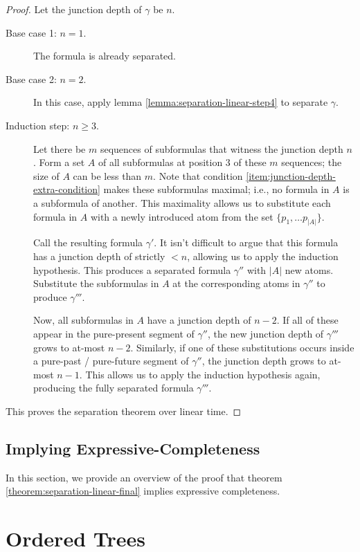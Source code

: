 \documentclass[a4paper,UKenglish,cleveref, autoref, thm-restate]{lipics-v2021}
\begin{document}
\begin{proof}
    Let the junction depth of $\gamma$ be $n$.
    \begin{description}
        \item[Base case 1: $n = 1$.] The formula is already separated.
        \item[Base case 2: $n = 2$.] In this case, apply lemma \ref{lemma:separation-linear-step4} to separate $\gamma$.
        \item[Induction step: $n \geq 3$.] Let there be $m$ sequences of subformulas that witness the junction depth $n$. Form a set $A$ of all subformulas at position 3 of these $m$ sequences; the size of $A$ can be less than $m$. Note that condition \ref{item:junction-depth-extra-condition} makes these subformulas maximal; i.e., no formula in $A$ is a subformula of another. This maximality allows us to substitute each formula in $A$ with a newly introduced atom from the set $\{p_1, \ldots p_{|A|}\}$.

        Call the resulting formula $\gamma'$. It isn't difficult to argue that this formula has a junction depth of strictly $< n$, allowing us to apply the induction hypothesis. This produces a separated formula $\gamma''$ with $|A|$ new atoms. Substitute the subformulas in $A$ at the corresponding atoms in $\gamma''$ to produce $\gamma'''$.

        Now, all subformulas in $A$ have a junction depth of $n - 2$. If all of these appear in the pure-present segment of $\gamma''$, the new junction depth of $\gamma'''$ grows to at-most $n - 2$. Similarly, if one of these substitutions occurs inside a pure-past / pure-future segment of $\gamma''$, the junction depth grows to at-most $n - 1$. This allows us to apply the induction hypothesis again, producing the fully separated formula $\gamma'''$.
    \end{description}
    This proves the separation theorem over linear time.
\end{proof}

\subsection{Implying Expressive-Completeness}

In this section, we provide an overview of the proof that theorem \ref{theorem:separation-linear-final} implies expressive completeness. %

\section{Ordered Trees}
\end{document}
